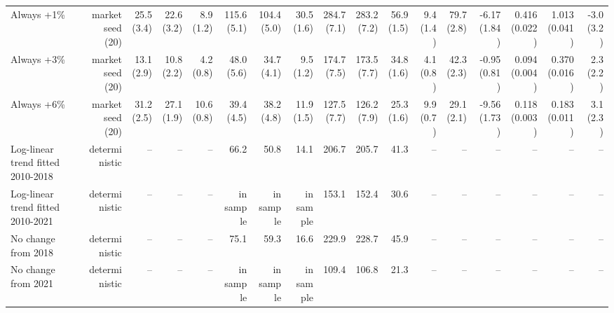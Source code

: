 \begin{tabular}{lrrrrrrrrrrrrrrrr}
Always +1\% & market seed (20) & 25.5 (3.4) & 22.6 (3.2) & 8.9 (1.2) & 115.6 (5.1) & 104.4 (5.0) & 30.5 (1.6) & 284.7 (7.1) & 283.2 (7.2) & 56.9 (1.5) & 9.4 (1.4) & 79.7 (2.8) & -6.17 (1.84) & 0.416 (0.022) & 1.013 (0.041) & -3.0 (3.2) \\
Always +3\% & market seed (20) & 13.1 (2.9) & 10.8 (2.2) & 4.2 (0.8) & 48.0 (5.6) & 34.7 (4.1) & 9.5 (1.2) & 174.7 (7.5) & 173.5 (7.7) & 34.8 (1.6) & 4.1 (0.8) & 42.3 (2.3) & -0.95 (0.81) & 0.094 (0.004) & 0.370 (0.016) & 2.3 (2.2) \\
Always +6\% & market seed (20) & 31.2 (2.5) & 27.1 (1.9) & 10.6 (0.8) & 39.4 (4.5) & 38.2 (4.8) & 11.9 (1.5) & 127.5 (7.7) & 126.2 (7.9) & 25.3 (1.6) & 9.9 (0.7) & 29.1 (2.1) & -9.56 (1.73) & 0.118 (0.003) & 0.183 (0.011) & 3.1 (2.3) \\
Log-linear trend fitted 2010-2018 & deterministic & -- & -- & -- & 66.2 & 50.8 & 14.1 & 206.7 & 205.7 & 41.3 & -- & -- & -- & -- & -- & -- \\
Log-linear trend fitted 2010-2021 & deterministic & -- & -- & -- & in sample & in sample & in sample & 153.1 & 152.4 & 30.6 & -- & -- & -- & -- & -- & -- \\
No change from 2018 & deterministic & -- & -- & -- & 75.1 & 59.3 & 16.6 & 229.9 & 228.7 & 45.9 & -- & -- & -- & -- & -- & -- \\
No change from 2021 & deterministic & -- & -- & -- & in sample & in sample & in sample & 109.4 & 106.8 & 21.3 & -- & -- & -- & -- & -- & -- \\
\bottomrule
\end{tabular}
